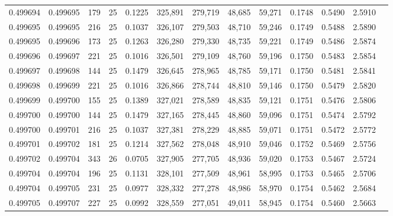 \begin{tabular}{rrrrrrrrrrrrr}
0.499694 & 0.499695 & 179 &  25 &                                     0.1225 & 325,891 & 279,719 &  48,685 &  59,271 & 0.1748 & 0.5490 & 2.5910 \\
0.499695 & 0.499695 & 216 &  25 &                                     0.1037 & 326,107 & 279,503 &  48,710 &  59,246 & 0.1749 & 0.5488 & 2.5890 \\
0.499695 & 0.499696 & 173 &  25 &                                     0.1263 & 326,280 & 279,330 &  48,735 &  59,221 & 0.1749 & 0.5486 & 2.5874 \\
0.499696 & 0.499697 & 221 &  25 &                                     0.1016 & 326,501 & 279,109 &  48,760 &  59,196 & 0.1750 & 0.5483 & 2.5854 \\
0.499697 & 0.499698 & 144 &  25 &                                     0.1479 & 326,645 & 278,965 &  48,785 &  59,171 & 0.1750 & 0.5481 & 2.5841 \\
0.499698 & 0.499699 & 221 &  25 &                                     0.1016 & 326,866 & 278,744 &  48,810 &  59,146 & 0.1750 & 0.5479 & 2.5820 \\
0.499699 & 0.499700 & 155 &  25 &                                     0.1389 & 327,021 & 278,589 &  48,835 &  59,121 & 0.1751 & 0.5476 & 2.5806 \\
0.499700 & 0.499700 & 144 &  25 &                                     0.1479 & 327,165 & 278,445 &  48,860 &  59,096 & 0.1751 & 0.5474 & 2.5792 \\
0.499700 & 0.499701 & 216 &  25 &                                     0.1037 & 327,381 & 278,229 &  48,885 &  59,071 & 0.1751 & 0.5472 & 2.5772 \\
0.499701 & 0.499702 & 181 &  25 &                                     0.1214 & 327,562 & 278,048 &  48,910 &  59,046 & 0.1752 & 0.5469 & 2.5756 \\
0.499702 & 0.499704 & 343 &  26 &                                     0.0705 & 327,905 & 277,705 &  48,936 &  59,020 & 0.1753 & 0.5467 & 2.5724 \\
0.499704 & 0.499704 & 196 &  25 &                                     0.1131 & 328,101 & 277,509 &  48,961 &  58,995 & 0.1753 & 0.5465 & 2.5706 \\
0.499704 & 0.499705 & 231 &  25 &                                     0.0977 & 328,332 & 277,278 &  48,986 &  58,970 & 0.1754 & 0.5462 & 2.5684 \\
0.499705 & 0.499707 & 227 &  25 &                                     0.0992 & 328,559 & 277,051 &  49,011 &  58,945 & 0.1754 & 0.5460 & 2.5663 \\

\end{tabular}
